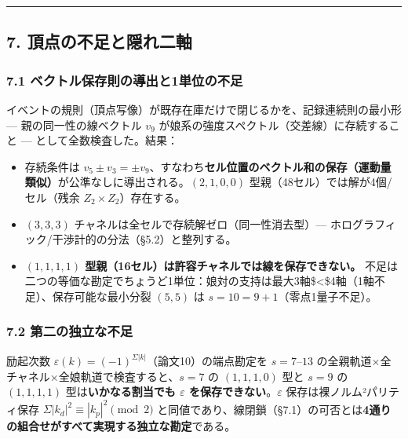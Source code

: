 \documentclass[
]{ltjsarticle}
\providecommand{\tightlist}{%
  \setlength{\itemsep}{0pt}\setlength{\parskip}{0pt}}
\begin{document}
\begin{center}\rule{0.5\linewidth}{0.5pt}\end{center}

\subsection{7.
頂点の不足と隠れ二軸}\label{ux9802ux70b9ux306eux4e0dux8db3ux3068ux96a0ux308cux4e8cux8ef8}

\subsubsection{7.1
ベクトル保存則の導出と1単位の不足}\label{ux30d9ux30afux30c8ux30ebux4fddux5b58ux5247ux306eux5c0eux51faux30681ux5358ux4f4dux306eux4e0dux8db3}

イベントの規則（頂点写像）が既存在庫だけで閉じるかを、記録連続則の最小形
--- 親の同一性の線ベクトル \(v_9\)
が娘系の強度スペクトル（交差線）に存続すること ---
として全数検査した。結果：

\begin{itemize}
\tightlist
\item
  存続条件は
  \(v_5\pm v_3=\pm v_9\)、すなわち\textbf{セル位置のベクトル和の保存（運動量類似）}が公準なしに導出される。\((2,1,0,0)\)
  型親（48セル）では解が4個/セル（残余 \(Z_2\times Z_2\)）存在する。
\item
  \((3,3,3)\) チャネルは全セルで存続解ゼロ（同一性消去型）---
  ホログラフィック/干渉計的の分法（§5.2）と整列する。
\item
  \textbf{\((1,1,1,1)\)
  型親（16セル）は許容チャネルでは線を保存できない。}
  不足は二つの等価な勘定でちょうど1単位：娘対の支持は最大3軸\$\textless\$4軸（1軸不足）、保存可能な最小分裂
  \((5,5)\) は \(s=10=9+1\)（零点1量子不足）。
\end{itemize}

\subsubsection{7.2
第二の独立な不足}\label{ux7b2cux4e8cux306eux72ecux7acbux306aux4e0dux8db3}

励起次数 \(\varepsilon(k)=(-1)^{\Sigma|k|}\)（論文10）の端点勘定を
\(s=7\)--\(13\) の全親軌道×全チャネル×全娘軌道で検査すると、\(s=7\) の
\((1,1,1,0)\) 型と \(s=9\) の \((1,1,1,1)\) 型は\textbf{いかなる割当でも
\(\varepsilon\) を保存できない}。\(\varepsilon\)
保存は裸ノルム²パリティ保存 \(\Sigma|k_d|^2\equiv|k_p|^2\pmod2\)
と同値であり、線閉鎖（§7.1）の可否とは\textbf{4通りの組合せがすべて実現する独立な勘定}である。
\end{document}

